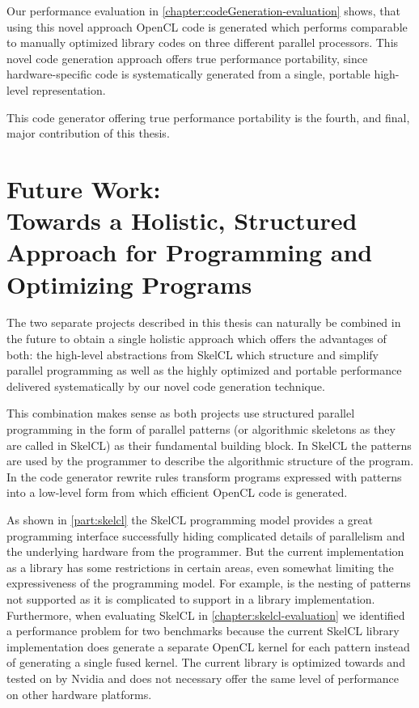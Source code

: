 Our performance evaluation in \autoref{chapter:codeGeneration-evaluation} shows, that using this novel approach OpenCL code is generated which performs comparable to manually optimized library codes on three different parallel processors.
This novel code generation approach offers true performance portability, since hardware-specific code is systematically generated from a single, portable high-level representation.

\bigskip
This code generator offering true performance portability is the fourth, and final, major contribution of this thesis.


\section[Future Work]{Future Work:\\ Towards a Holistic, Structured Approach for Programming and Optimizing Programs}
\label{section:future-work}
The two separate projects described in this thesis can naturally be combined in the future to obtain a single holistic approach which offers the advantages of both:
the high-level abstractions from SkelCL which structure and simplify parallel programming as well as the highly optimized and portable performance delivered systematically by our novel code generation technique.

This combination makes sense as both projects use structured parallel programming in the form of parallel patterns (or algorithmic skeletons as they are called in SkelCL) as their fundamental building block.
In SkelCL the patterns are used by the programmer to describe the algorithmic structure of the program.
In the code generator rewrite rules transform programs expressed with patterns into a low-level form from which efficient OpenCL code is generated.

As shown in \autoref{part:skelcl} the SkelCL programming model provides a great programming interface successfully hiding complicated details of parallelism and the underlying hardware from the programmer.
But the current implementation as a \Cpp library has some restrictions in certain areas, even somewhat limiting the expressiveness of the programming model.
For example, is the nesting of patterns not supported as it is complicated to support in a library implementation.
Furthermore, when evaluating SkelCL in \autoref{chapter:skelcl-evaluation} we identified a performance problem for two benchmarks because the current SkelCL library implementation does generate a separate OpenCL kernel for each pattern instead of generating a single fused kernel.
The current library is optimized towards and tested on \GPUs by Nvidia and does not necessary offer the same level of performance on other hardware platforms.

